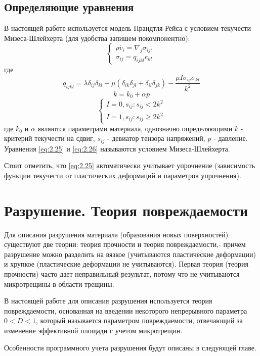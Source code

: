 \documentclass[12pt,a4paper, titlepage, openany]{book}
\begin{document}
\subsection{Определяющие уравнения}
В настоящей работе используется модель Прандтля-Рейса с условием текучести Мизеса-Шлейхерта (для удобства запишем покомпонентно):
\begin{equation}
\begin{cases}
\rho \dot{v_i} = \nabla_j \sigma_{ij}, \\
\sigma_{ij} = q_{ijkl}e_{kl}
\end{cases}
\end{equation}
где
\begin{equation}
q_{ijkl} = \lambda \delta_{ij}\delta_{kl} + \mu(\delta_{ik}\delta_{jl} + \delta_{il}\delta_{jk}) - \frac{\mu I \sigma_{ij}\sigma_{kl}}{k^2}
\end{equation}
\begin{equation}
\label{eq:2.25}
k = k_0 + \alpha p
\end{equation}
\begin{equation}
\label{eq:2.26}
\begin{cases}
I = 0, s_{ij} : s_{ij} < 2k^2 \\
I = 1, s_{ij} : s_{ij} \geq 2k^2
\end{cases}
\end{equation}
где $k_0$ и $\alpha$ являются параметрами материала, однозначно определяющими $k$ - критерий текучести на сдвиг, $s_{ij}$ - девиатор тензора напряжений, $p$ - давление. Уравнения \ref{eq:2.25} и \ref{eq:2.26} называются условием Мизеса-Шлейхерта.
\par
Стоит отметить, что \ref{eq:2.25} автоматически учитывает упрочнение (зависимость функции текучести от пластических деформаций и параметров упрочнения).







\section{Разрушение. Теория повреждаемости}
Для описания разрушения материала (образования новых поверхностей) существуют две теории: теория прочности и теория повреждаемости,- причем разрушение можно разделить на вязкое (учитываются пластические деформации) и хрупкое (пластические деформации не учитываются). Первая теория (теория прочности) часто дает неправильный результат, потому что не учитываются микротрещины в области трещины. 
\par
В настоящей работе для описания разрушения используется теория повреждаемости, основанная на введении некоторого непрерывного параметра $0 < D < 1$, который называется параметром повреждаемости, отвечающий за изменение эффективной площади с учетом микротрещин.
\par 
Особенности программного учета разрушения будут описаны в следующей главе.
\end{document}
